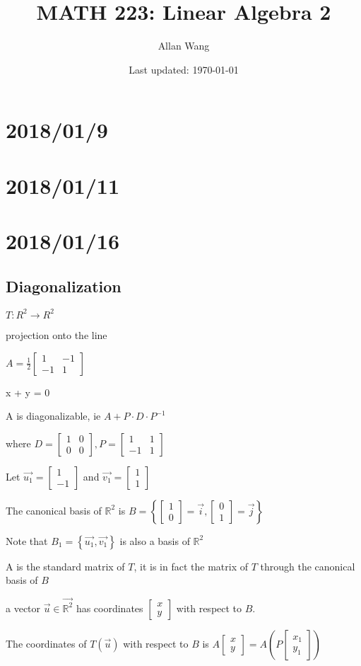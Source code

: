\documentclass[12pt]{article}
\author{Allan Wang}
\date{Last updated: \today}
\title{MATH 223: Linear Algebra 2}
\renewcommand{\v}[1]{\overrightarrow{#1}}
\newcommand\m[1]{\begin{bmatrix}#1\end{bmatrix}}
\newcommand{\real}[0]{\mathbb{R}}
\newcommand{\bb}[1]{\left\{#1\right\}}
\newcommand{\pp}[1]{\left(#1\right)}
\begin{document}
\onehalfspacing
\maketitle
\tableofcontents
\pagebreak
\section{2018/01/9}
\section{2018/01/11}
\section{2018/01/16}

\subsection{Diagonalization}

\(T: R^2 \rightarrow R^2\)

projection onto the line

\(A = \frac{1}{2} \m{1 & -1 \\ -1 & 1}\)

x + y = 0

A is diagonalizable, ie \(A + P \cdot D \cdot P^{-1}\)

where \(D = \m{1 & 0 \\ 0 & 0}, P = \m{1 & 1 \\ -1 & 1}\)

Let \(\v{u_1} = \m{1 \\ -1}\) and \(\v{v_1} = \m{1 \\ 1}\)

The canonical basis of \(\real^2\) is \(B = \bb{\m{1 \\ 0} = \v{i}, \m{0 \\ 1} = \v{j}}\)

Note that \(B_1 = \bb{\v{u_1}, \v{v_1}}\) is also a basis of \(\real^2\)

A is the standard matrix of \(T\), it is in fact the matrix of \(T\) through the canonical basis of \(B\)

a vector \(\v{u} \in \v{\real^2}\) has coordinates \(\m{x \\ y}\) with respect to \(B\).

The coordinates of \(T(\v{u})\) with respect to \(B\) is \(A \m{x \\ y} = A\pp{P \m{x_1 \\ y_1}}\) 
\end{document}
